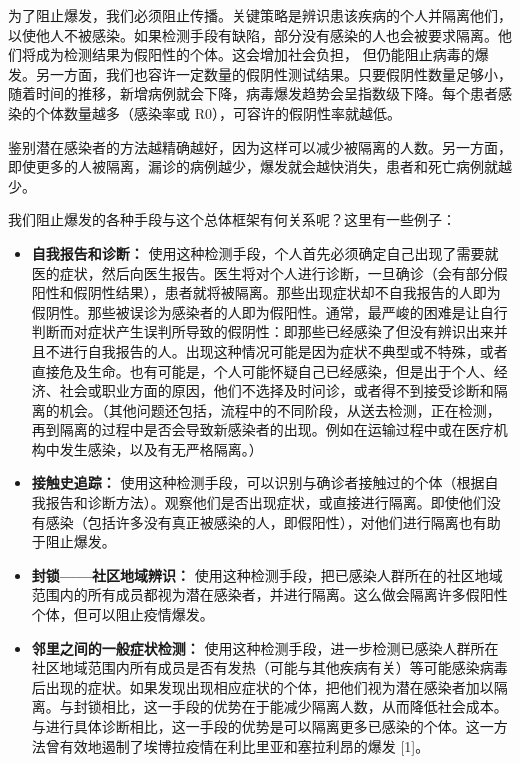 \documentclass[onecolumn,journal]{IEEEtran}
\begin{document}
\begin{multicols}{2}

  为了阻止爆发，我们必须阻止传播。关键策略是辨识患该疾病的个人并隔离他们，以使他人不被感染。如果检测手段有缺陷，部分没有感染的人也会被要求隔离。他们将成为检测结果为假阳性的个体。这会增加社会负担， 但仍能阻止病毒的爆发。另一方面，我们也容许一定数量的假阴性测试结果。只要假阴性数量足够小，随着时间的推移，新增病例就会下降，病毒爆发趋势会呈指数级下降。每个患者感染的个体数量越多（感染率或 R0），可容许的假阴性率就越低。

  鉴别潜在感染者的方法越精确越好，因为这样可以减少被隔离的人数。另一方面，即使更多的人被隔离，漏诊的病例越少，爆发就会越快消失，患者和死亡病例就越少。

我们阻止爆发的各种手段与这个总体框架有何关系呢？这里有一些例子：

\begin{itemize}
  \item \textbf{自我报告和诊断：} 使用这种检测手段，个人首先必须确定自己出现了需要就医的症状，然后向医生报告。医生将对个人进行诊断，一旦确诊（会有部分假阳性和假阴性结果），患者就将被隔离。那些出现症状却不自我报告的人即为假阴性。那些被误诊为感染者的人即为假阳性。通常，最严峻的困难是让自行判断而对症状产生误判所导致的假阴性：即那些已经感染了但没有辨识出来并且不进行自我报告的人。出现这种情况可能是因为症状不典型或不特殊，或者直接危及生命。也有可能是，个人可能怀疑自己已经感染，但是出于个人、经济、社会或职业方面的原因，他们不选择及时问诊，或者得不到接受诊断和隔离的机会。（其他问题还包括，流程中的不同阶段，从送去检测，正在检测，再到隔离的过程中是否会导致新感染者的出现。例如在运输过程中或在医疗机构中发生感染，以及有无严格隔离。）

  \item \textbf{接触史追踪：} 使用这种检测手段，可以识别与确诊者接触过的个体（根据自我报告和诊断方法）。观察他们是否出现症状，或直接进行隔离。即使他们没有感染（包括许多没有真正被感染的人，即假阳性），对他们进行隔离也有助于阻止爆发。

  \item \textbf{封锁——社区地域辨识：} 使用这种检测手段，把已感染人群所在的社区地域范围内的所有成员都视为潜在感染者，并进行隔离。这么做会隔离许多假阳性个体，但可以阻止疫情爆发。

  \item \textbf{邻里之间的一般症状检测：} 使用这种检测手段，进一步检测已感染人群所在社区地域范围内所有成员是否有发热（可能与其他疾病有关）等可能感染病毒后出现的症状。如果发现出现相应症状的个体，把他们视为潜在感染者加以隔离。与封锁相比，这一手段的优势在于能减少隔离人数，从而降低社会成本。与进行具体诊断相比，这一手段的优势是可以隔离更多已感染的个体。这一方法曾有效地遏制了埃博拉疫情在利比里亚和塞拉利昂的爆发 [1]。


\end{itemize}
\end{multicols}
\end{document}
